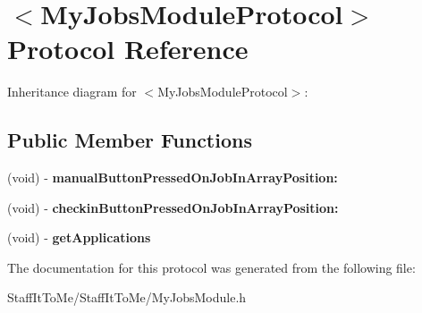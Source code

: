 \hypertarget{protocol_my_jobs_module_protocol-p}{
\section{$<$\-My\-Jobs\-Module\-Protocol$>$ \-Protocol \-Reference}
\label{protocol_my_jobs_module_protocol-p}
}


\-Inheritance diagram for $<$\-My\-Jobs\-Module\-Protocol$>$\-:
\subsection*{\-Public \-Member \-Functions}
\begin{DoxyCompactItemize}
\item 
\hypertarget{protocol_my_jobs_module_protocol-p_aab4481b64e9ab6d053929277ac89cb0d}{
(void) -\/ {\bfseries manual\-Button\-Pressed\-On\-Job\-In\-Array\-Position\-:}}
\label{protocol_my_jobs_module_protocol-p_aab4481b64e9ab6d053929277ac89cb0d}

\item 
\hypertarget{protocol_my_jobs_module_protocol-p_adc20ca61e28747e29b6ab1dd4caeb020}{
(void) -\/ {\bfseries checkin\-Button\-Pressed\-On\-Job\-In\-Array\-Position\-:}}
\label{protocol_my_jobs_module_protocol-p_adc20ca61e28747e29b6ab1dd4caeb020}

\item 
\hypertarget{protocol_my_jobs_module_protocol-p_adbeb21eb45b3aa872eb2f638d3c16e46}{
(void) -\/ {\bfseries get\-Applications}}
\label{protocol_my_jobs_module_protocol-p_adbeb21eb45b3aa872eb2f638d3c16e46}

\end{DoxyCompactItemize}


\-The documentation for this protocol was generated from the following file\-:\begin{DoxyCompactItemize}
\item 
\-Staff\-It\-To\-Me/\-Staff\-It\-To\-Me/\-My\-Jobs\-Module.\-h\end{DoxyCompactItemize}
